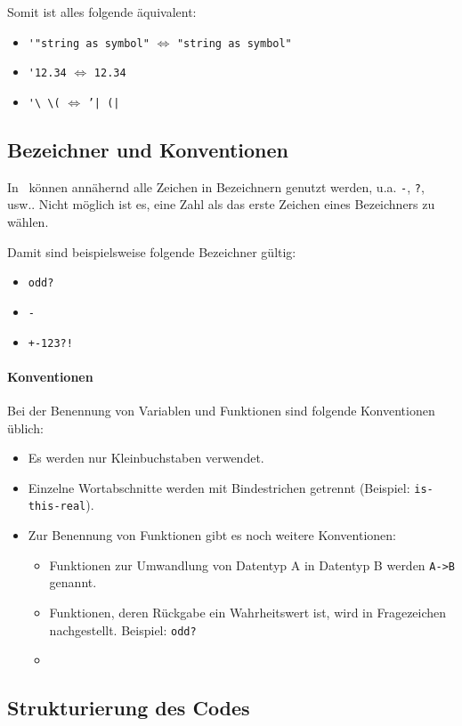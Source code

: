 		Somit ist alles folgende äquivalent:
		\begin{itemize}
			\item \lstinline[language = Racket]|'"string as symbol"| \(\iff\) \lstinline[language = Racket]|"string as symbol"|
			\item \lstinline[language = Racket]|'12.34| \(\iff\) \lstinline[language = Racket]|12.34|
			\item \lstinline[language = Racket]|'\ \(| \(\iff\) \texttt{'| (|}
		\end{itemize}

\subsection{Bezeichner und Konventionen}

	In \racket\, können annähernd alle Zeichen in Bezeichnern genutzt werden, u.a. \texttt{-}, \texttt{?}, usw.. Nicht möglich ist es, eine Zahl als das erste Zeichen eines Bezeichners zu wählen.
	
	Damit sind beispielsweise folgende Bezeichner gültig:
	\begin{itemize}
		\item \texttt{odd?}
		\item \texttt{-}
		\item \texttt{+-123?!}
	\end{itemize}

	\paragraph{Konventionen}
		Bei der Benennung von Variablen und Funktionen sind folgende Konventionen üblich:
		\begin{itemize}
			\item Es werden nur Kleinbuchstaben verwendet.
			\item Einzelne Wortabschnitte werden mit Bindestrichen getrennt (Beispiel: \texttt{is-this-real}).
			\item Zur Benennung von Funktionen gibt es noch weitere Konventionen:
				\begin{itemize}
					\item Funktionen zur Umwandlung von Datentyp A in Datentyp B werden \texttt{A->B} genannt.
					\item Funktionen, deren Rückgabe ein Wahrheitswert ist, wird in Fragezeichen nachgestellt. Beispiel: \texttt{odd?}
					\item {}
				\end{itemize}
		\end{itemize}

\subsection{Strukturierung des Codes}
